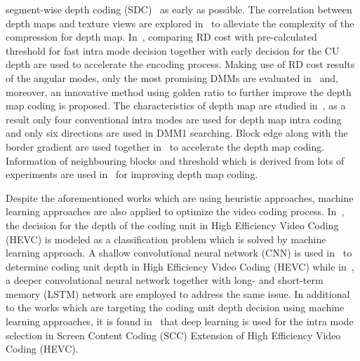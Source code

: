 segment-wise depth coding (SDC)~\parencite{RN123}
as early as possible.
The correlation between depth maps and texture views are explored
in~\parencite{RN94} to alleviate the complexity of the
compression for depth map.
In~\parencite{RN212}, comparing RD cost with pre-calculated threshold for fast
intra mode decision together with early decision for the CU depth are used
to accelerate the encoding process.
Making use of RD cost results of the angular modes, only the most promising
DMMs are evaluated in~\parencite{RN87} and, moreover, an innovative
method using golden ratio to further improve the
depth map coding is proposed.
The characteristics of depth map are studied in~\parencite{RN91},
as a result only four conventional intra modes are used for
depth map intra coding and only six directions are used in DMM1 searching.
Block edge along with the border gradient are used together
in~\parencite{RN114} to accelerate the depth map coding.
Information of neighbouring blocks and threshold which is derived from
lots of experiments are used in~\parencite{RN85} for improving depth
map coding.

Despite the aforementioned works which are using heuristic approaches,
machine learning approaches are also applied to optimize the
video coding process.
In~\parencite{RN74}, the decision for the depth of the coding unit
in High Efficiency Video Coding (HEVC) is modeled as a classification
problem which is solved by machine learning approach.
A shallow convolutional neural network (CNN) is
used in~\parencite{RN78} to determine coding unit depth in
High Efficiency Video Coding (HEVC) while
in~\parencite{DBLP:journals-corr-abs-1710-01218}, a deeper convolutional
neural network together with long- and short-term memory (LSTM) network
are employed to address the same issue.
In additional to the works which are targeting the
coding unit depth decision using machine learning approaches, it is found
in~\parencite{RN73} that deep learning is used for the intra mode
selection in Screen Content Coding (SCC)
Extension of High Efficiency Video Coding (HEVC).

